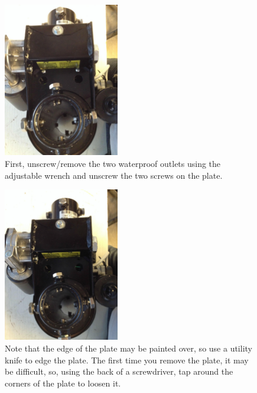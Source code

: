 \documentclass[11pt]{article} %
\begin{document}
\begin{figure}
  \centering
  \caption{First, unscrew/remove the two waterproof outlets using the adjustable wrench and unscrew the two screws on the plate.}
  \includegraphics[width=0.45\textwidth]{wiring/02.jpeg}
\end{figure}


\begin{figure}
  \centering
  \caption{Note that the edge of the plate may be painted over, so use a utility knife to edge the plate. The first time you remove the plate, it may be difficult, so, using the back of a screwdriver, tap around the corners of the plate to loosen it. }
  \includegraphics[width=0.45\textwidth]{wiring/03.jpeg}
\end{figure}
\end{document}
